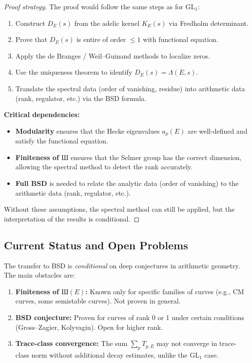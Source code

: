 \begin{proof}[Proof strategy]
The proof would follow the same steps as for $\mathrm{GL}_1$:
\begin{enumerate}
\item Construct $D_E(s)$ from the adelic kernel $K_E(s)$ via Fredholm determinant.
\item Prove that $D_E(s)$ is entire of order $\leq 1$ with functional equation.
\item Apply the de Branges / Weil–Guinand methods to localize zeros.
\item Use the uniqueness theorem to identify $D_E(s) = \Lambda(E, s)$.
\item Translate the spectral data (order of vanishing, residue) into arithmetic data (rank, regulator, etc.) via the BSD formula.
\end{enumerate}

\textbf{Critical dependencies:}
\begin{itemize}
\item \textbf{Modularity} ensures that the Hecke eigenvalues $a_p(E)$ are well-defined and satisfy the functional equation.
\item \textbf{Finiteness of $\text{Ш}$} ensures that the Selmer group has the correct dimension, allowing the spectral method to detect the rank accurately.
\item \textbf{Full BSD} is needed to relate the analytic data (order of vanishing) to the arithmetic data (rank, regulator, etc.).
\end{itemize}

Without these assumptions, the spectral method can still be applied, but the interpretation of the results is conditional.
\end{proof}

\subsection{Current Status and Open Problems}

\begin{remark}\label{rem:limitations-BSD}
The transfer to BSD is \emph{conditional} on deep conjectures in arithmetic geometry. The main obstacles are:
\begin{enumerate}
\item \textbf{Finiteness of $\text{Ш}(E)$:} Known only for specific families of curves (e.g., CM curves, some semistable curves). Not proven in general.
\item \textbf{BSD conjecture:} Proven for curves of rank 0 or 1 under certain conditions (Gross–Zagier, Kolyvagin). Open for higher rank.
\item \textbf{Trace-class convergence:} The sum $\sum_p T_{p,E}$ may not converge in trace-class norm without additional decay estimates, unlike the $\mathrm{GL}_1$ case.
\end{enumerate}
\end{remark}

